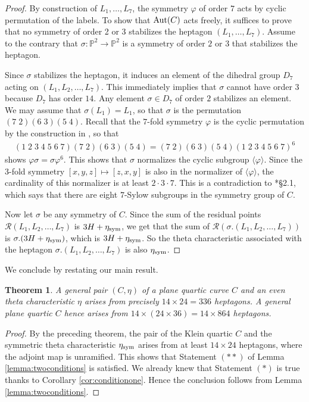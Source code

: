 \documentclass[12pt]{article}
\newtheorem{theorem}{Theorem}[section]
\numberwithin{equation}{section}
\theoremstyle{definition}
\renewcommand{\P}{\mathbb{P}}
\newcommand{\etasym}{\eta_{\rm sym}}
\begin{document}
\begin{proof}
	By construction of $L_1,\dots,L_7$, the symmetry $\varphi$ of order $7$ acts by cyclic permutation of the labels. To show that ${\rm Aut}(C)$ acts freely, it suffices to prove that no symmetry of order 2 or 3 stabilizes the heptagon $(L_1,\dots,L_7)$. Assume to the contrary that $\sigma \colon \P^2 \to \P^2$ is a symmetry of order $2$ or $3$ that stabilizes the heptagon.
	
	Since $\sigma$ stabilizes the heptagon, it induces an element of the dihedral group $D_7$ acting on $(L_1,L_2,\ldots,L_7)$. This immediately implies that $\sigma$ cannot have order $3$ because $D_7$ has order $14$. Any element $\sigma\in D_7$ of order $2$ stabilizes an element. We may assume that $\sigma(L_1) = L_1$, so that $\sigma$ is the permutation $(7\; 2) (6\; 3) (5\; 4)$.
	Recall that the $7$-fold symmetry $\varphi$ is the cyclic permutation by the construction in , so that
	\begin{align*}
	(1\; 2\; 3\; 4\; 5\; 6\; 7) (7\; 2) (6\; 3) (5\; 4) = (7\; 2) (6\; 3) (5\; 4) (1\; 2\; 3\; 4\; 5\; 6\; 7)^6
	\end{align*}
	shows $\varphi \sigma = \sigma \varphi^6$. This shows that $\sigma$ normalizes the cyclic subgroup $\langle \varphi \rangle$.
	Since the 3-fold symmetry $[x,y,z] \mapsto [z,x,y]$ is also in the normalizer of $\langle\varphi\rangle$, the cardinality of this normalizer is at least $2\cdot3\cdot7$. This is a contradiction to \cite{zbMATH01574981}*{\S2.1}, which says that there are eight $7$-Sylow subgroups in the symmetry group of $C$.
	
	Now let $\sigma$ be any symmetry of $C$. Since the sum of the residual points $\mathcal{R}(L_1,L_2,\ldots,L_7)$ is $3H + \etasym$, we get that the sum of $\mathcal{R}(\sigma.(L_1,L_2,\ldots,L_7))$ is $\sigma.(3H + \etasym)$, which is $3H + \etasym$. So the theta characteristic associated with the heptagon $\sigma.(L_1,L_2,\ldots,L_7)$ is also $\etasym$.
\end{proof}

We conclude by restating our main result.
\begin{theorem}\label{theorem:main}
    A general pair $(C,\eta)$ of a plane quartic curve $C$ and an even theta characteristic $\eta$ arises from precisely $14\times 24=336$ heptagons. A general plane quartic $C$ hence arises from $14\times (24\times 36)=14\times 864$ heptagons.  
\end{theorem}

\begin{proof}
	
	By the preceding theorem, the pair of the Klein quartic $C$ and the symmetric theta characteristic $\etasym$ arises from at least $14\times 24$ heptagons, where the adjoint map is unramified. This shows that Statement $(**)$ of Lemma \ref{lemma:twoconditions} is satisfied. We already knew that Statement $(*)$ is true thanks to Corollary \ref{cor:conditionone}. Hence the conclusion follows from Lemma \ref{lemma:twoconditions}.
\end{proof}
\end{document}
